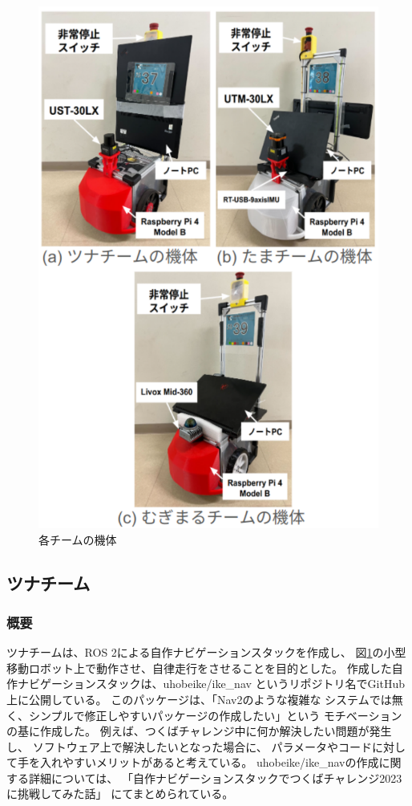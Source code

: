 \documentclass[twocolumn,9pt]{jsproceedings}
\begin{document}
\begin{figure}[h]
  \begin{center}
    \includegraphics[width=1.0\linewidth]{figs/robot.pdf}
    \caption{各チームの機体}
    \label{fig:robot}
  \end{center}
\end{figure}
\subsection{ツナチーム}

\subsubsection{概要}
ツナチームは、ROS 2による自作ナビゲーションスタックを作成し、
図\ref{fig:robot}の小型移動ロボット上で動作させ、自律走行をさせることを目的とした。
作成した自作ナビゲーションスタックは、uhobeike/ike\_nav\cite{ike_nav}
というリポジトリ名でGitHub上に公開している。
このパッケージは、「Nav2のような複雑な
システムでは無く、シンプルで修正しやすいパッケージの作成したい」という
モチベーションの基に作成した。
例えば、つくばチャレンジ中に何か解決したい問題が発生し、
ソフトウェア上で解決したいとなった場合に、
パラメータやコードに対して手を入れやすいメリットがあると考えている。
uhobeike/ike\_navの作成に関する詳細については、
「自作ナビゲーションスタックでつくばチャレンジ2023に挑戦してみた話」
\cite{ike_nav_detail}にてまとめられている。
\end{document}

